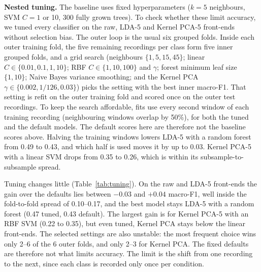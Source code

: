 \textbf{Nested tuning.} The baseline uses fixed hyperparameters ($k=5$ neighbours, SVM
$C=1$ or 10, 300 fully grown trees). To check whether these limit accuracy, we tuned every
classifier on the raw, LDA-5 and Kernel PCA-5 front-ends without selection bias. The outer
loop is the usual six grouped folds. Inside each outer training fold, the five remaining
recordings per class form five inner grouped folds, and a grid search (neighbours
$\{1,5,15,45\}$; linear $C\in\{0.01,0.1,1,10\}$; RBF $C\in\{1,10,100\}$ and
$\gamma$; forest minimum leaf size $\{1,10\}$; Naive Bayes variance smoothing; and the
Kernel PCA $\gamma\in\{0.002, 1/126, 0.03\}$) picks the setting with the best inner
macro-F1. That setting is refit on the outer training fold and scored once on the outer
test recordings. To keep the search affordable, fits use every second window of each
training recording (neighbouring windows overlap by 50\%), for both the tuned and the
default models. The default scores here are therefore not the baseline scores above.
Halving the training windows lowers LDA-5 with a random forest from 0.49 to 0.43, and which
half is used moves it by up to 0.03. Kernel PCA-5 with a linear SVM drops from 0.35 to
0.26, which is within its subsample-to-subsample spread.

Tuning changes little (Table~\ref{tab:tuning}). On the raw and LDA-5 front-ends the gain
over the defaults lies between $-0.03$ and $+0.04$ macro-F1, well inside the fold-to-fold
spread of 0.10--0.17, and the best model stays LDA-5 with a random forest (0.47 tuned,
0.43 default). The largest gain is for Kernel PCA-5 with an RBF SVM (0.22 to 0.35), but
even tuned, Kernel PCA stays below the linear front-ends. The selected settings are also
unstable: the most frequent choice wins only 2--6 of the 6 outer folds, and only 2--3 for
Kernel PCA. The fixed defaults are therefore not what limits accuracy. The limit is the
shift from one recording to the next, since each class is recorded only once per
condition.

\begin{table}[t]
  \centering
  \caption{Nested grouped tuning: macro-F1 with fixed defaults and after tuning (mean of
  6 outer folds), and the most frequently selected setting (folds it won). Both columns fit
  on every second training window, so the defaults sit below the baseline scores.}
  \label{tab:tuning}
  \resizebox{\columnwidth}{!}{}
\end{table}
